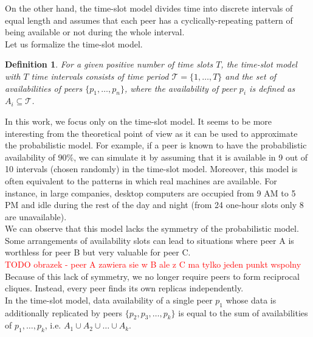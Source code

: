 \documentclass{pracamgren}
\newcounter{collective_ctr} \numberwithin{collective_ctr}{section}
\newtheorem{definition}{Definition}[collective_ctr]
\begin{document}

On the other hand, the time-slot model divides time into discrete intervals of equal length and assumes that each peer has a cyclically-repeating pattern of being available or not during the whole interval.\\

Let us formalize the time-slot model.
\begin{definition}
For a given positive number of time slots $T$, the time-slot model with $T$ time intervals consists of time period $\mathcal{T} = \{1,\ldots,T\}$ and the set of availabilities of peers $\{p_1,\ldots,p_n\}$, where the availability of peer $p_i$ is defined as $A_i\subseteq\mathcal{T}$.\\
\end{definition}

In this work, we focus only on the time-slot model. It seems to be more interesting from the theoretical point of view as it can be used to approximate the probabilistic model. For example, if a peer is known to have the probabilistic availability of $90\%$, we can simulate it by assuming that it is available in 9 out of 10 intervals (chosen randomly) in the time-slot model. Moreover, this model is often equivalent to the patterns in which real machines are available. For instance, in large companies, desktop computers are occupied from 9 AM to 5 PM and idle during the rest of the day and night (from 24 one-hour slots only 8 are unavailable).\\

We can observe that this model lacks the symmetry of the probabilistic model. Some arrangements of availability slots can lead to situations where peer A is worthless for peer B but very valuable for peer C.\\

\textcolor{red}{TODO obrazek - peer A zawiera sie w B ale z C ma tylko jeden punkt wspolny}\\

Because of this lack of symmetry, we no longer require peers to form reciprocal cliques. Instead, every peer finds its own replicas independently.\\

In the time-slot model, data availability of a single peer $p_1$ whose data is additionally replicated by peers $\{p_{2}, p_{3}, \ldots, p_{k}\}$ is equal to the sum of availabilities of $p_1, \ldots, p_k$, i.e. $A_1 \cup A_2 \cup \ldots \cup A_k$.\\
 
\end{document}
